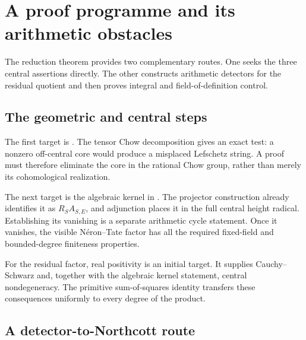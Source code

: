 \documentclass[11pt,a4paper]{article}
\theoremstyle{definition}
\numberwithin{equation}{section}
\begin{document}
\section{A proof programme and its arithmetic obstacles}
\label{sec:programme}

The reduction theorem provides two complementary routes.
One seeks the three central assertions directly. The other
constructs arithmetic detectors for the residual quotient
and then proves integral and field-of-definition control.

\subsection{The geometric and central steps}\label{sec:geometric-steps}

The first target is . The tensor Chow
decomposition gives an exact test: a nonzero off-central
core would produce a misplaced Lefschetz string.
A proof must therefore eliminate the core in the rational
Chow group, rather than merely its cohomological realization.

The next target is the algebraic kernel in
. The projector construction already identifies
it as \(R_SA_{S,E}\), and adjunction places it in the full
central height radical. Establishing its vanishing is a
separate arithmetic cycle statement. Once it vanishes,
the visible Néron--Tate factor has all the required
fixed-field and bounded-degree finiteness properties.

For the residual factor, real positivity is an initial
target. It supplies Cauchy--Schwarz and, together with the
algebraic kernel statement, central nondegeneracy.
The primitive sum-of-squares identity transfers these
consequences uniformly to every degree of the product.

\subsection{A detector-to-Northcott route}\label{sec:arithmetic-steps}
\end{document}
